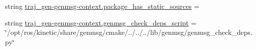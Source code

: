 \begin{DoxyCompactItemize}
\item 
string \hyperlink{namespacetraj__gen-genmsg-context_af35b61303a0f549aa91143caa757dcae}{traj\+\_\+gen-\/genmsg-\/context.\+package\+\_\+has\+\_\+static\+\_\+sources} = \textquotesingle{}\textquotesingle{}
\item 
string \hyperlink{namespacetraj__gen-genmsg-context_a3ed92e9c7478bb9c31ce3ba8d513b7e0}{traj\+\_\+gen-\/genmsg-\/context.\+genmsg\+\_\+check\+\_\+deps\+\_\+script} = \char`\"{}/opt/ros/kinetic/share/genmsg/cmake/../../../lib/genmsg/genmsg\+\_\+check\+\_\+deps.\+py\char`\"{}
\end{DoxyCompactItemize}
